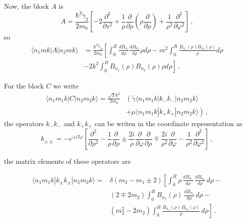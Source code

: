 \documentclass[12pt,a4paper]{article}
\begin{document}
Now, the block $A$ is
\begin{equation}
A = \frac{\hbar^2 \tilde{\gamma}_2}{2 m_0}\left[ -2 \frac{\partial^2}{\partial z^2} +
    \frac{1}{\rho}\frac{\partial}{\partial \rho}\left(\rho \frac{\partial}{\partial \rho} \right) +
    \frac{1}{\rho^2} \frac{\partial^2}{\partial \varphi^2} \right]\,,
\end{equation}
\noindent so
\begin{equation}
\begin{split}
\langle n_1 m k|A|n_2 m k\rangle &= \frac{\hbar^2 \tilde{\gamma}_2}{2 m_0}
                                    \left[\int_0^R \frac{dB_{n_1}}{d\rho} \frac{dB_{n_2}}{d\rho} \rho d\rho
                                         - m^2 \int_0^R \frac{B_{n_1}(\rho)B_{n_2}(\rho)}{\rho} d\rho \right.\\
                                 &  \left.- 2 k^2 \int_0^R  B_{n_1}(\rho)B_{n_2}(\rho) \rho d\rho\right]\,.
\end{split}
\end{equation}

For the block $C$ we write
\begin{equation}
\begin{split}
\langle n_1 m_1 k|C|n_2 m_2 k\rangle = \frac{\sqrt{3}\hbar^2}{2 m_0}&\left( \tilde{\gamma}\langle n_1 m_1 k|k_-k_-|n_2 m_2 k\rangle \right. \\
                &\left.+ \mu \langle n_1 m_1 k|k_+k_+|n_2 m_2 k\rangle\right)\,,
\end{split}
\end{equation}
\noindent the operators $k_-k_-$ and $k_+k_+$ can be writen in the coordinate representation as
\begin{equation}
k_{\pm\pm} = - e^{\pm i 2\varphi}\left[\frac{\partial^2}{\partial \rho^2} -
               \frac{1}{\rho}\frac{\partial}{\partial \rho} \pm
               \frac{2 i}{\rho}\frac{\partial}{\partial \varphi} \frac{\partial}{\partial \rho} \mp
               \frac{2 i}{\rho^2}\frac{\partial}{\partial \varphi} -
               \frac{1}{\rho^2}\frac{\partial^2}{\partial \varphi^2}  \right] \,,
\end{equation}

\noindent
the matrix elements of these operators are

\begin{equation}
\begin{split}
\langle n_1 m_1 k|k_{\pm}k_{\pm}|n_2 m_2 k\rangle =& \delta(m_2-m_1 \pm 2)
                                 \left[\int_0^R \rho\, \frac{dB_{n_1}}{d \rho}\,\frac{dB_{n_2}}{d \rho}\, d\rho -\right.\\
                                 &\left(2\mp 2m_2 \right) \int_0^R B_{n_1}(\rho)\,\frac{dB_{n_2}}{d \rho}\,d\rho -\\
                                 &\left.\left(m_2^2-2m_2\right)\int_0^R \frac{B_{n_1}(\rho)\,B_{n_2}(\rho)}{\rho}\,d\rho \right]\,.
\end{split}
\end{equation}
\end{document}
